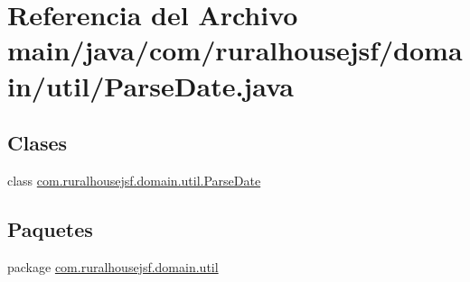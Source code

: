 \hypertarget{a00053}{}\section{Referencia del Archivo main/java/com/ruralhousejsf/domain/util/\+Parse\+Date.java}
\label{a00053}
\subsection*{Clases}
\begin{DoxyCompactItemize}
\item 
class \mbox{\hyperlink{a00196}{com.\+ruralhousejsf.\+domain.\+util.\+Parse\+Date}}
\end{DoxyCompactItemize}
\subsection*{Paquetes}
\begin{DoxyCompactItemize}
\item 
package \mbox{\hyperlink{a00117}{com.\+ruralhousejsf.\+domain.\+util}}
\end{DoxyCompactItemize}
